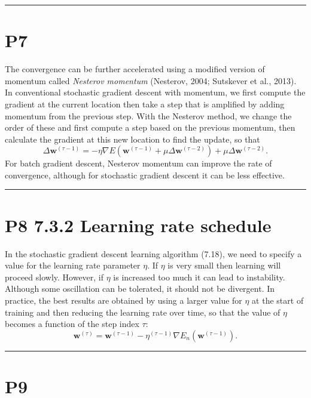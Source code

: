 \documentclass{article}
\begin{document}
\noindent\rule{\linewidth}{0.4pt}

\section{P7}

The convergence can be further accelerated using a modified version of momentum called \emph{Nesterov momentum} (Nesterov, 2004; Sutskever et al., 2013). In conventional stochastic gradient descent with momentum, we first compute the gradient at the current location then take a step that is amplified by adding momentum from the previous step. With the Nesterov method, we change the order of these and first compute a step based on the previous momentum, then calculate the gradient at this new location to find the update, so that
\begin{equation}
\Delta \mathbf{w}^{(\tau-1)} = -\eta \nabla E\left(\mathbf{w}^{(\tau-1)} + \mu \Delta \mathbf{w}^{(\tau-2)}\right) + \mu \Delta \mathbf{w}^{(\tau-2)}.
\tag{7.34}
\end{equation}
For batch gradient descent, Nesterov momentum can improve the rate of convergence, although for stochastic gradient descent it can be less effective.

\noindent\rule{\linewidth}{0.4pt}

\section{P8 7.3.2 Learning rate schedule}

In the stochastic gradient descent learning algorithm (7.18), we need to specify a value for the learning rate parameter $\eta$. If $\eta$ is very small then learning will proceed slowly. However, if $\eta$ is increased too much it can lead to instability. Although some oscillation can be tolerated, it should not be divergent. In practice, the best results are obtained by using a larger value for $\eta$ at the start of training and then reducing the learning rate over time, so that the value of $\eta$ becomes a function of the step index $\tau$:
\begin{equation}
\mathbf{w}^{(\tau)} = \mathbf{w}^{(\tau-1)} - \eta^{(\tau-1)} \nabla E_n(\mathbf{w}^{(\tau-1)}).
\tag{7.35}
\end{equation}

\noindent\rule{\linewidth}{0.4pt}

\section{P9}
\end{document}
